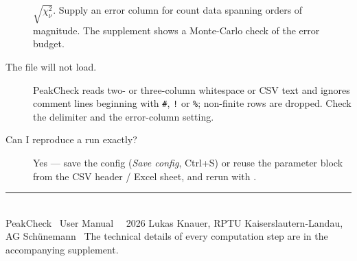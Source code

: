 \documentclass[11pt,a4paper]{article}
\begin{document}
\begin{description}
$\sqrt{\chi^2_\nu}$. Supply an error column for count data spanning orders of
magnitude. The supplement shows a Monte-Carlo check of the error budget.
\item[The file will not load.] PeakCheck reads two- or three-column whitespace or
CSV text and ignores comment lines beginning with \texttt{\#}, \texttt{!} or
\texttt{\%}; non-finite rows are dropped. Check the delimiter and the error-column
setting.
\item[Can I reproduce a run exactly?] Yes --- save the config (\emph{Save config},
Ctrl+S) or reuse the parameter block from the CSV header / Excel 
sheet, and rerun with .
\end{description}

\noindent\rule{\linewidth}{0.4pt}\\[2pt]
{\footnotesize PeakCheck \textperiodcentered\ User Manual \textperiodcentered\
\textcopyright\ 2026 Lukas Knauer, RPTU Kaiserslautern-Landau, AG Sch\"unemann
\textperiodcentered\ The technical details of every computation step are in the
accompanying supplement.}
\end{document}
